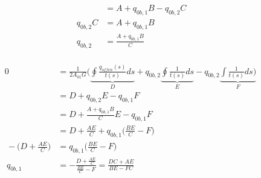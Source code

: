 \begin{itemize}
\begin{equation}
\begin{split}
			&=A+q_{0b,1}B-q_{0b,2}C\\\
		q_{0b,2}C&=A+q_{0b,1}B\\\
		q_{0b,2}&=\frac{A+q_{0b,1}B}{C}
		\end{split}
	\end{equation}\\
	\begin{equation}
		\begin{split}
			0 &= \frac{1}{2A_{01}G}(\underbrace{\oint\frac{q_{offen}(s)}{t(s)}ds}_D+q_{0b,2}\underbrace{\oint\frac{1}{t(s)}ds}_E-q_{0b,2}\underbrace{\int\frac{1}{t(s)}ds)}_F\\\
			&=D+q_{0b,2}E-q_{0b,1}F\\\
			&=D+\frac{A+q_{0b,1}B}{C}E-q_{0b,1}F\\\
			&=D+\frac{AE}{C}+q_{0b,1}\bigg(\frac{BE}{C}-F\bigg)\\\
			-\bigg(D+\frac{AE}{C}\bigg)&=q_{0b,1}\bigg(\frac{BE}{C}-F\bigg)\\\
			q_{0b,1}&=-\frac{D+\frac{AE}{C}}{\frac{BE}{C}-F}=\frac{DC+AE}{BE-FC}
		\end{split}
	\end{equation}\\
\end{itemize}
\newpage
